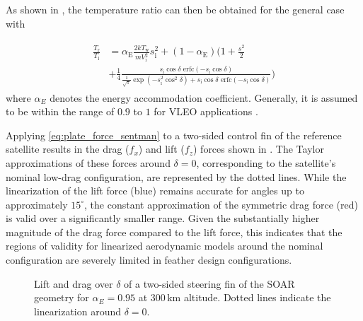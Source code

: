 \documentclass[pdflatex,sn-mathphys-num]{sn-jnl}%
\theoremstyle{thmstyleone}%
\theoremstyle{thmstyletwo}%
\theoremstyle{thmstylethree}%
\begin{document}
		As shown in \cite{tuttasGeneralizedTreatmentEnergy2024}, the temperature ratio can then be obtained for the general case with

		\begin{align}
			\begin{split}
				\frac{T_\mathrm{r}}{T_\mathrm{i}} &= \alpha_\mathrm{E} \frac{2 k T_\mathrm{w}}{m V_\mathrm{i}^2} s_{\text{i}}^2
                + \left( 1 - \alpha_\mathrm{E} \right) 
                \bigg(
					1 + \frac{s^2}{2} \\ & 
                    + \frac{1}{4} \frac{ s_{\text{i}} \cos\delta \text{ erfc}\left( - s_{\text{i}} \cos\delta \right) }{\frac{1}{\sqrt{\pi}} \exp \left( - s_{\text{i}}^2 \cos^2\delta \right) + s_{\text{i}} \cos\delta \text{ erfc}\left( - s_{\text{i}} \cos\delta \right)}
				\bigg)
			\end{split}
		\end{align}
		where $\alpha_E$ denotes the energy accommodation coefficient. Generally, it is assumed to be within the range of $0.9$ to $1$ for VLEO applications \cite{moe_gassurface_2005}.

		Applying \cref{eq:plate_force_sentman} to a two-sided control fin of the reference satellite results in the drag ($f_x$) and lift ($f_z$) forces shown in . The Taylor approximations of these forces around $\delta = 0$, corresponding to the satellite's nominal low-drag configuration, are represented by the dotted lines.
		While the linearization of the lift force (blue) remains accurate for angles up to approximately $15^\circ$, the constant approximation of the symmetric drag force (red) is valid over a significantly smaller range. Given the substantially higher magnitude of the drag force compared to the lift force, this indicates that the regions of validity for linearized aerodynamic models around the nominal configuration are severely limited in feather design configurations.


		\begin{figure}[t]
			\centering
			
			\caption{Lift and drag over $\delta$ of a two-sided steering fin of the SOAR geometry for $\alpha_E=0.95$ at $300\,\text{km}$ altitude. Dotted lines indicate the linearization around $\delta=0$.}
			\label{fig:linearization}
		\end{figure}
		
\end{document}
